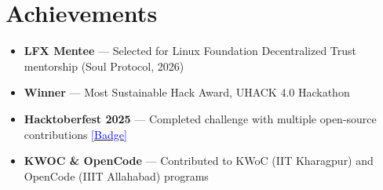 \documentclass[a4paper,10pt]{article}
\newcommand{\resumeItem}[1]{\item\small{#1 \vspace{-2pt}}}
\newcommand{\resumeItemListEnd}{\end{itemize}\vspace{-2pt}}
\newcommand{\resumeSubHeadingListStart}{\begin{itemize}[leftmargin=*]}
\begin{document}
\section{Achievements}
\resumeSubHeadingListStart
\resumeItem{\textbf{LFX Mentee} — Selected for Linux Foundation Decentralized Trust mentorship (Soul Protocol, 2026)}
\resumeItem{\textbf{Winner} — Most Sustainable Hack Award, UHACK 4.0 Hackathon}
\resumeItem{\textbf{Hacktoberfest 2025} — Completed challenge with multiple open-source contributions \href{https://www.holopin.io/@sshekhar563}{\textcolor{blue}{[Badge]}}}
\resumeItem{\textbf{KWOC \& OpenCode} — Contributed to KWoC (IIT Kharagpur) and OpenCode (IIIT Allahabad) programs}
\resumeItemListEnd
\end{document}
